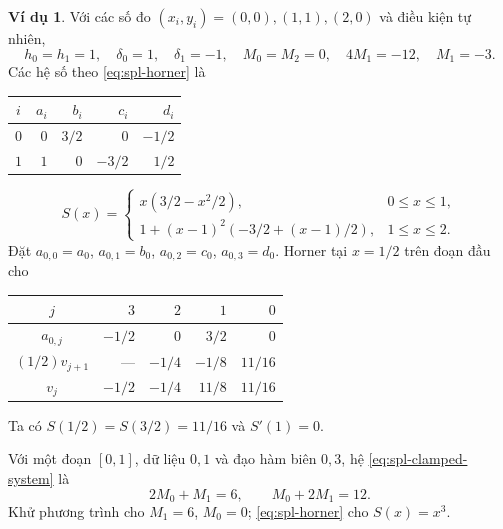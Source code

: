 \documentclass[12pt,a4paper,oneside]{book}
\numberwithin{algorithm}{chapter}
\theoremstyle{definition}
\newtheorem{vidu}{Ví dụ}[chapter]
\begin{document}
\begin{vidu}
Với các số đo $(x_i,y_i)=(0,0),(1,1),(2,0)$ và điều kiện tự nhiên,
\[
 h_0=h_1=1,\quad\delta_0=1,\quad\delta_1=-1,\quad M_0=M_2=0,\quad4M_1=-12,\quad M_1=-3.
\]
Các hệ số theo \eqref{eq:spl-horner} là
\begin{center}\begin{tabular}{c|rrrr}\toprule
$i$&$a_i$&$b_i$&$c_i$&$d_i$\\\midrule
$0$&$0$&$3/2$&$0$&$-1/2$\\
$1$&$1$&$0$&$-3/2$&$1/2$\\\bottomrule
\end{tabular}\end{center}
\[
 S(x)=\begin{cases}x(3/2-x^2/2),&0\leq x\leq1,\\
 1+(x-1)^2(-3/2+(x-1)/2),&1\leq x\leq2.
 \end{cases}
\]
Đặt $a_{0,0}=a_0$, $a_{0,1}=b_0$, $a_{0,2}=c_0$, $a_{0,3}=d_0$. Horner tại $x=1/2$ trên đoạn đầu cho
\begin{center}\begin{tabular}{c|rrrr}\toprule
$j$&$3$&$2$&$1$&$0$\\\midrule
$a_{0,j}$&$-1/2$&$0$&$3/2$&$0$\\
$(1/2)v_{j+1}$&---&$-1/4$&$-1/8$&$11/16$\\\midrule
$v_j$&$-1/2$&$-1/4$&$11/8$&$\boxed{11/16}$\\\bottomrule
\end{tabular}\end{center}
Ta có $S(1/2)=S(3/2)=11/16$ và $S'(1)=0$.

Với một đoạn $[0,1]$, dữ liệu $0,1$ và đạo hàm biên $0,3$, hệ \eqref{eq:spl-clamped-system} là
\[
 2M_0+M_1=6,\qquad M_0+2M_1=12.
\]
Khử phương trình cho $M_1=6$, $M_0=0$; \eqref{eq:spl-horner} cho $S(x)=x^3$.
\end{vidu}
\end{document}
